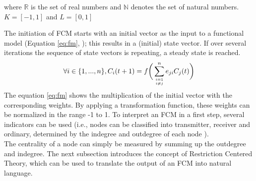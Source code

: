 \documentclass[conference]{IEEEtran}
\begin{document}
where \begin{math} \mathbb{R} \end{math} is the set of real numbers and \begin{math} \mathbb{N} \end{math} denotes the set of natural numbers. \begin{math} K = [-1,1] \end{math} and \begin{math} L = [0,1] \end{math} \cite{stach2005}

The initiation of FCM starts with an initial vector as the input to a functional model (Equation \ref{eq:fm}, \cite{stach2005}); this results in a (initial) state vector. If over several iterations the sequence of state vectors is repeating, a steady state is reached.  
\begin{equation}\label{eq:fm}
\forall i \in \{1,...,n\},C_{i}(t+1) = f  \bigg(\sum_{i=1 \atop i \neq j}^{n} e_{ji}C_{j}(t)\bigg)
\end{equation}
The equation \ref{eq:fm} shows the multiplication of the initial vector with the corresponding weights. By applying a transformation function, these weights can be normalized in the range -1 to 1. To interpret an FCM in a first step, several indicators can be used (i.e., nodes can be classified into transmitter, receiver and ordinary, determined by the indegree and outdegree of each node \cite{ozesmi2004}).\\
The centrality of a node can simply be measured by summing up the outdegree and indegree. The next subsection introduces the concept of Restriction Centered Theory, which can be used to translate the output of an FCM into natural language. 
\end{document}
